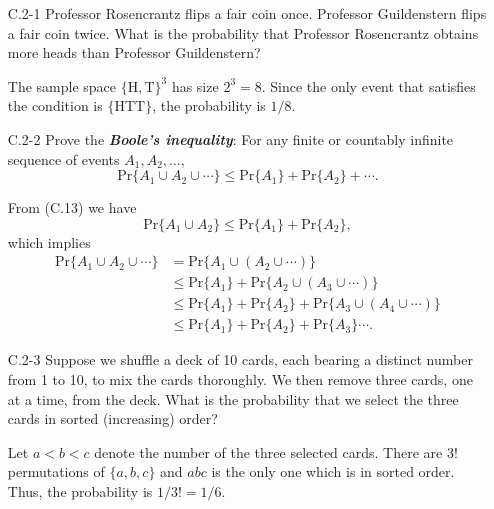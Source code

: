 \begin{enumerate}

\item[C.2{-}1] {Professor Rosencrantz flips a fair coin once. Professor
Guildenstern flips a fair coin twice. What is the probability that Professor
Rosencrantz obtains more heads than Professor Guildenstern?}

\begin{framed}
The sample space $\{\text{H}, \text{T}\}^3$ has size $2^3 = 8$. Since the only
event that satisfies the condition is $\{\text{HTT}\}$, the probability is $1/8$.
\end{framed}

\item[C.2{-}2] {Prove the \textbf{\emph{Boole's inequality}}: For any finite or
countably infinite sequence of events $A_1, A_2, \dots$,
\[
  \text{Pr}\{A_1 \cup A_2 \cup \cdots\} \le \text{Pr}\{A_1\} + \text{Pr}\{A_2\} + \cdots.
\]
}

\begin{framed}
From (C.13) we have
\[
\text{Pr}\{A_1 \cup A_2\} \le \text{Pr}\{A_1\} + \text{Pr}\{A_2\},
\]
which implies
\begin{equation*}
\begin{aligned}
  \text{Pr}\{A_1 \cup A_2 \cup \cdots\} &=   \text{Pr}\{A_1 \cup (A_2 \cup \cdots)\}\\
                                        &\le \text{Pr}\{A_1\} + \text{Pr}\{A_2 \cup (A_3 \cup \cdots)\}\\
                                        &\le \text{Pr}\{A_1\} + \text{Pr}\{A_2\} + \text{Pr}\{A_3 \cup (A_4 \cup \cdots)\}\\
                                        &\le \text{Pr}\{A_1\} + \text{Pr}\{A_2\} + \text{Pr}\{A_3\} \cdots.
\end{aligned}
\end{equation*}
\end{framed}

\item[C.2{-}3] {Suppose we shuffle a deck of 10 cards, each bearing a distinct
number from 1 to 10, to mix the cards thoroughly. We then remove three cards,
one at a time, from the deck. What is the probability that we select the three
cards in sorted (increasing) order?}

\begin{framed}
Let $a < b < c$ denote the number of the three selected cards. There are $3!$
permutations of $\{a, b, c\}$ and $abc$ is the only one which is in sorted
order. Thus, the probability is $1/3! = 1/6$.
\end{framed}


\end{enumerate}
